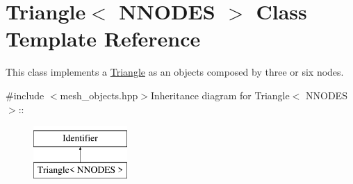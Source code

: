 \hypertarget{classTriangle}{
\section{Triangle$<$ NNODES $>$ Class Template Reference}
\label{classTriangle}
}


This class implements a \hyperlink{classTriangle}{Triangle} as an objects composed by three or six nodes.  


{\ttfamily \#include $<$mesh\_\-objects.hpp$>$}Inheritance diagram for Triangle$<$ NNODES $>$::\begin{figure}[H]
\begin{center}
\leavevmode
\includegraphics[height=2cm]{classTriangle}
\end{center}
\end{figure}
